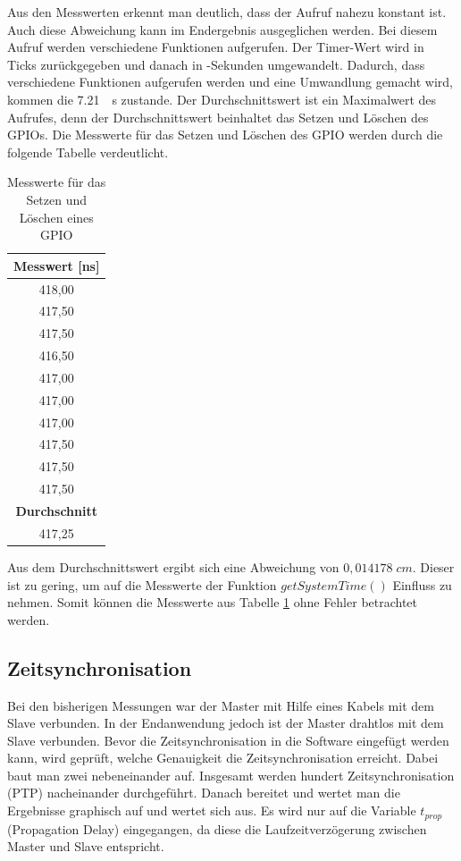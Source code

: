 Aus den Messwerten erkennt man deutlich, dass der Aufruf nahezu konstant ist. Auch diese Abweichung kann im Endergebnis ausgeglichen werden. Bei diesem Aufruf werden verschiedene Funktionen aufgerufen. Der Timer-Wert wird in Ticks zurückgegeben und danach in \si{\mu}-Sekunden umgewandelt. Dadurch, dass verschiedene Funktionen aufgerufen werden und eine Umwandlung gemacht wird, kommen die \SI{7,21}{\mu\s} zustande. Der Durchschnittswert ist ein Maximalwert des Aufrufes, denn der Durchschnittswert beinhaltet das Setzen und Löschen des GPIOs. Die Messwerte für das Setzen und Löschen des GPIO werden durch die folgende Tabelle verdeutlicht.

\begin{table}[H]
\centering
\caption{Messwerte für das Setzen und Löschen eines GPIO}
\label{table:modul_E2}
\begin{tabular}{|c|}
\hline
\textbf{Messwert [\si{ns}]} \\ \hline
418,00                     \\ \hline
417,50                     \\ \hline
417,50                     \\ \hline
416,50                     \\ \hline
417,00                     \\ \hline
417,00                     \\ \hline
417,00                     \\ \hline
417,50                     \\ \hline
417,50                     \\ \hline
417,50                     \\ \hline
\textbf{Durchschnitt}      \\ \hline
417,25                     \\ \hline
\end{tabular}
\end{table}

Aus dem Durchschnittswert ergibt sich eine Abweichung von $0,014178 \; cm$. Dieser ist zu gering, um auf die Messwerte der Funktion $getSystemTime()$ Einfluss zu nehmen. Somit können die Messwerte aus Tabelle \ref{table:modul_E2} ohne Fehler betrachtet werden.


\subsection{Zeitsynchronisation}
Bei den bisherigen Messungen war der Master mit Hilfe eines Kabels mit dem Slave verbunden. In der Endanwendung jedoch ist der Master drahtlos mit dem Slave verbunden. Bevor die Zeitsynchronisation in die Software eingefügt werden kann, wird geprüft, welche Genauigkeit die Zeitsynchronisation erreicht. Dabei baut man zwei \board \platz nebeneinander auf. Insgesamt werden hundert Zeitsynchronisation (PTP) nacheinander durchgeführt. Danach bereitet und wertet man die Ergebnisse graphisch auf und wertet sich aus. Es wird nur auf die Variable $t_{prop}$ (Propagation Delay) eingegangen, da diese die Laufzeitverzögerung zwischen Master und Slave entspricht.
 
